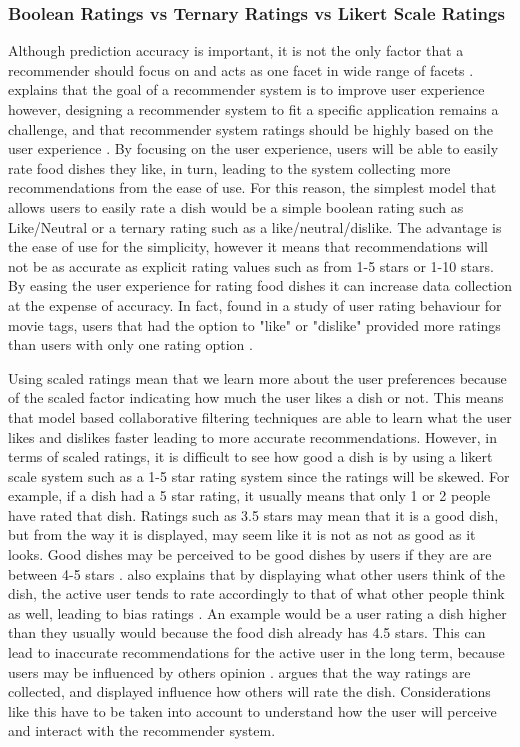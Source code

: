\subsubsection{Boolean Ratings vs Ternary Ratings vs Likert Scale Ratings}

Although prediction accuracy is important, it is not the only factor that a recommender should focus on and acts as one facet in wide range of facets \cite{martin2009recsys}. \citeauthor{martin2009recsys} explains that the goal of a recommender system is to improve user experience however, designing a recommender system to fit a specific application remains a challenge, and that recommender system ratings should be highly based on the user experience \cite{martin2009recsys}. By focusing on the user experience, users will be able to easily rate food dishes they like, in turn, leading to the system collecting more recommendations from the ease of use. For this reason, the simplest model that allows users to easily rate a dish would be a simple boolean rating such as Like/Neutral or a ternary rating such as a like/neutral/dislike. The advantage is the ease of use for the simplicity, however it means that recommendations will not be as accurate as explicit rating values such as from 1-5 stars or 1-10 stars. By easing the user experience for rating food dishes it can increase data collection at the expense of accuracy. In fact, \citeauthor{movieratings} found in a study of user rating behaviour for movie tags, users that had the option to "like" or "dislike" provided more ratings than users with only one rating option \cite{schafer2007collaborative ,movieratings}. 

Using scaled ratings mean that we learn more about the user preferences because of the scaled factor indicating how much the user likes a dish or not. This means that model based collaborative filtering techniques are able to learn what the user likes and dislikes faster leading to more accurate recommendations. However, in terms of scaled ratings, it is difficult to see how good a dish is by using a likert scale system such as a 1-5 star rating system since the ratings will be skewed. For example, if a dish had a 5 star rating, it usually means that only 1 or 2 people have rated that dish. Ratings such as 3.5 stars may mean that it is a good dish, but from the way it is displayed, may seem like it is not as not as good as it looks. Good dishes may be perceived to be good dishes by users if they are are between 4-5 stars \cite{recommendable}. \citeauthor{interface} also explains that by displaying what other users think of the dish, the active user tends to rate accordingly to that of what other people think as well, leading to bias ratings \cite{interface}. An example would be a user rating a dish higher than they usually would because the food dish already has 4.5 stars. This can lead to inaccurate recommendations for the active user in the long term, because users may be influenced by others opinion \cite{interface}. \citeauthor{interface} argues that the way ratings are collected, and displayed influence how others will rate the dish. Considerations like this have to be taken into account to understand how the user will perceive and interact with the recommender system.  

